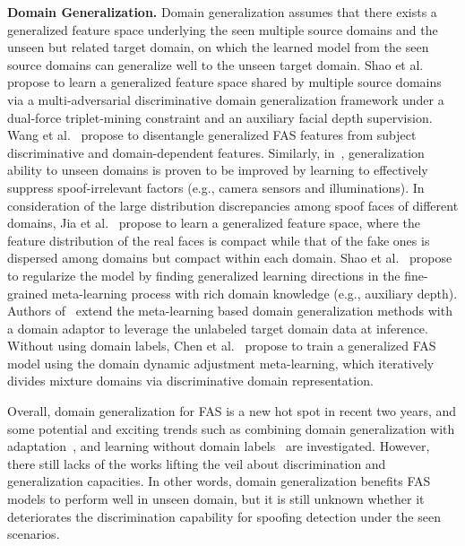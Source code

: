 \documentclass[10pt,journal,compsoc]{IEEEtran}
\begin{document}
\vspace{0.4em}
\noindent\textbf{Domain Generalization.}\quad   
Domain generalization assumes that there exists a generalized feature space underlying the seen multiple source domains and the unseen but related target domain, on which the learned model from the seen source domains can generalize well to the unseen target domain. Shao et al.~\cite{shao2019multi} propose to learn a generalized feature space shared by multiple source domains via a multi-adversarial discriminative domain generalization framework under a dual-force triplet-mining constraint and an auxiliary facial depth supervision. Wang et al.~\cite{wang2020cross} propose to disentangle generalized FAS features from subject discriminative and domain-dependent features. Similarly, in~\cite{kim2020suppressing}, generalization ability to unseen domains is proven to be improved by learning to effectively suppress spoof-irrelevant factors (e.g., camera sensors and illuminations). In consideration of the large distribution discrepancies among spoof faces of different domains, Jia et al.~\cite{jia2020single} propose to learn a generalized feature space, where the feature distribution of the real faces is compact while that of the fake ones is dispersed among domains but compact within each domain. Shao et al.~\cite{shao2019regularized} propose to regularize the model by finding generalized learning directions in the fine-grained meta-learning process with rich domain knowledge (e.g., auxiliary depth). Authors of~\cite{wang2021self} extend the meta-learning based domain generalization methods with a domain adaptor to leverage the unlabeled target domain data at inference. Without using domain labels, Chen et al.~\cite{chen2021generalized} propose to train a generalized FAS model using the domain dynamic adjustment meta-learning, which iteratively divides mixture domains via discriminative domain representation.


Overall, domain generalization for FAS is a new hot spot in recent two years, and some potential and exciting trends such as combining domain generalization with adaptation~\cite{wang2021self}, and learning without domain labels~\cite{chen2021generalized} are investigated. However, there still lacks of the works lifting the veil about discrimination and generalization capacities. In other words, domain generalization benefits FAS models to perform well in unseen domain, but it is still unknown whether it deteriorates the discrimination capability for spoofing detection under the seen scenarios.
\end{document}
